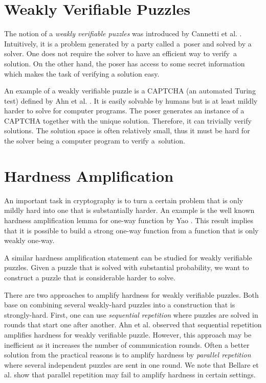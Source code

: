 \section{Weakly Verifiable Puzzles}
The notion of a \textit{weakly verifiable puzzles} was introduced by Cannetti et al. \cite{canetti2005hardness}.
Intuitively, it is a problem generated by a party called a~poser
and solved by a solver. One does not require the solver to have an efficient way to verify~a solution.
On the other hand, the poser has access to some secret information which makes the task of verifying a solution easy.

An example of a weakly verifiable puzzle is a CAPTCHA (an automated Turing test) defined by Ahn et al. \cite{von2003captcha}.
It is easily solvable by humans but is at least mildly harder to solve for computer programs.
The poser generates an instance of a CAPTCHA together with the unique solution.
Therefore, it can trivially verify solutions.
The solution space is often relatively small,
thus it must be hard for the solver being a computer program to verify a~solution.

\section{Hardness Amplification}
An important task in cryptography is to turn a certain problem that is only mildly hard into one that is substantially harder.
An example is the well known hardness amplification lemma for one-way function by Yao \cite{yao1982theory}.
This result implies that it is possible to build a strong one-way function from a function that is only weakly one-way.

A similar hardness amplification statement can be studied for weakly verifiable puzzles.
Given a puzzle that is solved with substantial probability, we want to construct a puzzle that is considerable harder to solve.

There are two approaches to amplify hardness for weakly verifiable puzzles.
Both base on combining several weakly-hard puzzles into a construction that is strongly-hard.
First, one can use \textit{sequential repetition} where puzzles are solved in rounds that start one after another.
Ahn et al. \cite{von2003captcha} observed that sequential repetition amplifies hardness for weakly verifiable puzzle.
However, this approach may be inefficient as it increases the number of communication rounds.
Often a better solution from the practical reasons is to amplify hardness by \textit{parallel repetition}
where several independent puzzles are sent in one round.
We note that Bellare et al. \cite{bellare1997does} show that parallel repetition may fail to amplify hardness in certain settings.

